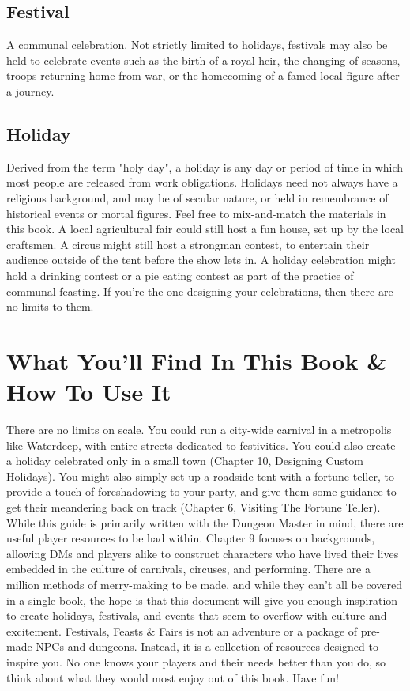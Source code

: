 \documentclass[10pt,a4paper,twoside,twocolumn,openany,bg=print,nodeprecatedcode]{dndbook}
\begin{document}
\subsection{Festival}
A communal celebration. Not strictly limited to holidays, festivals may also be held to celebrate events such as the birth of a royal heir, the changing of seasons, troops returning home from war, or the homecoming of a famed local figure after a journey.
\subsection{Holiday}
Derived from the term "holy day", a holiday is any day or period of time in which most people are released from work obligations. Holidays need not always have a religious background, and may be of secular nature, or held in remembrance of historical events or mortal figures. Feel free to mix-and-match the materials in this book. A local agricultural fair could still host a fun house, set up by the local craftsmen. A circus might still host a strongman contest, to entertain their audience outside of the tent before the show lets in. A holiday celebration might hold a drinking contest or a pie eating contest as part of the practice of communal feasting. If you're the one designing your celebrations, then there are no limits to them.
\section{What You'll Find In This Book \& How To Use It}
There are no limits on scale. You could run a city-wide carnival in a metropolis like Waterdeep, with entire streets dedicated to festivities. You could also create a holiday celebrated only in a small town (Chapter 10, Designing Custom Holidays). You might also simply set up a roadside tent with a fortune teller, to provide a touch of foreshadowing to your party, and give them some guidance to get their meandering back on track (Chapter 6, Visiting The Fortune Teller). While this guide is primarily written with the Dungeon Master in mind, there are useful player resources to be had within. Chapter 9 focuses on backgrounds, allowing DMs and players alike to construct characters who have lived their lives embedded in the culture of carnivals, circuses, and performing.
There are a million methods of merry-making to be made, and while they can't all be covered in a single book, the hope is that this document will give you enough inspiration to create holidays, festivals, and events that seem to overflow with culture and excitement. Festivals, Feasts \& Fairs is not an adventure or a package of pre-made NPCs and dungeons. Instead, it is a collection of resources designed to inspire you. No one knows your players and their needs better than you do, so think about what they would most enjoy out of this book. Have fun!
\end{document}

